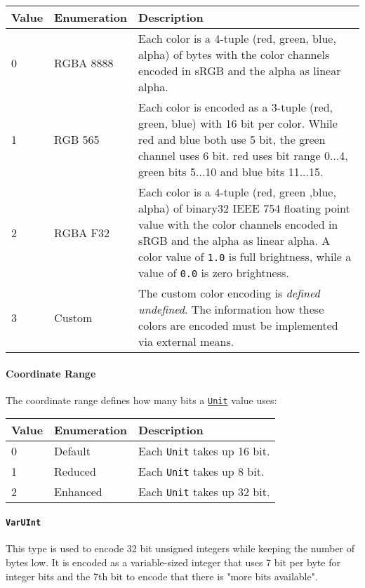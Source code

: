 \documentclass[]{article}
\begin{document}
\begin{longtable}[]{@{}p{1in}p{2in}p{3in}@{}}
\toprule
Value & Enumeration & Description \\
\midrule
\endhead
0 & RGBA 8888 & Each color is a 4-tuple (red, green, blue, alpha) of
bytes with the color channels encoded in sRGB and the alpha as linear
alpha. \\
1 & RGB 565 & Each color is encoded as a 3-tuple (red, green, blue) with
16 bit per color. While red and blue both use 5 bit, the green channel
uses 6 bit. red uses bit range 0...4, green bits 5...10 and blue bits
11...15. \\
2 & RGBA F32 & Each color is a 4-tuple (red, green ,blue, alpha) of
binary32 IEEE 754 floating point value with the color channels encoded
in sRGB and the alpha as linear alpha. A color value of \texttt{1.0} is
full brightness, while a value of \texttt{0.0} is zero brightness. \\
3 & Custom & The custom color encoding is \emph{defined undefined}. The
information how these colors are encoded must be implemented via
external means. \\
\bottomrule
\end{longtable}

\hypertarget{coordinate-range}{%
\paragraph{Coordinate Range}\label{coordinate-range}}

The coordinate range defines how many bits a
\protect\hyperlink{units}{\texttt{Unit}} value uses:

\begin{longtable}[]{@{}p{1in}p{2in}p{3in}@{}}
\toprule
Value & Enumeration & Description \\
\midrule
\endhead
0 & Default & Each \texttt{Unit} takes up 16 bit. \\
1 & Reduced & Each \texttt{Unit} takes up 8 bit. \\
2 & Enhanced & Each \texttt{Unit} takes up 32 bit. \\
\bottomrule
\end{longtable}

\hypertarget{varuint}{%
\paragraph{\texorpdfstring{\texttt{VarUInt}}{VarUInt}}\label{varuint}}

This type is used to encode 32 bit unsigned integers while keeping the
number of bytes low. It is encoded as a variable-sized integer that uses
7 bit per byte for integer bits and the 7th bit to encode that there is
"more bits available".
\end{document}
